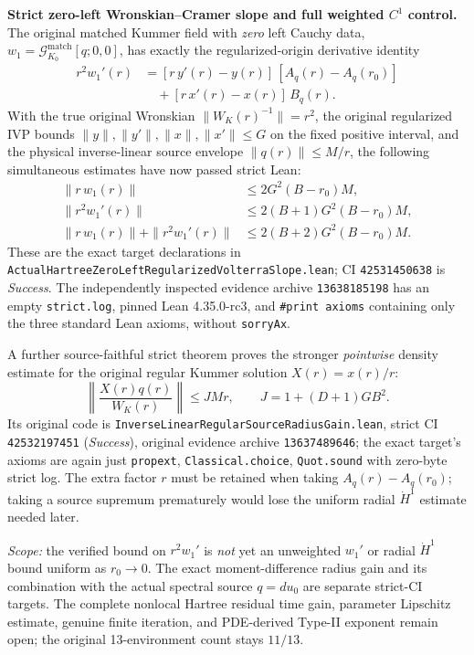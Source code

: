 \documentclass[11pt]{amsart}
\begin{document}
\medskip
\noindent\textbf{Strict zero-left Wronskian--Cramer slope and full
weighted $C^1$ control.}
The original matched Kummer field with \emph{zero} left Cauchy data,
\(w_1=\mathcal G_{K_0}^{\mathrm{match}}[q;0,0]\),
has exactly the regularized-origin derivative identity
\[
 \begin{aligned}
 r^2 w_1'(r)
  &=[r\,y'(r)-y(r)]\,[A_q(r)-A_q(r_0)]\\
  &\quad+[r\,x'(r)-x(r)]\,B_q(r).
 \end{aligned}
\]
With the true original Wronskian
\(\|W_K(r)^{-1}\|=r^2\),
the original regularized IVP bounds
\(\|y\|,\|y'\|,\|x\|,\|x'\|\le G\)
on the fixed positive interval, and the physical inverse-linear
source envelope \(\|q(r)\|\le M/r\), the following simultaneous
estimates have now passed strict Lean:
\[
 \boxed{
 \begin{aligned}
 \|r\,w_1(r)\|&\le 2G^2(B-r_0)M,\\
 \|r^2 w_1'(r)\|&\le 2(B+1)G^2(B-r_0)M,\\
 \|r\,w_1(r)\|+\|r^2w_1'(r)\|
 &\le 2(B+2)G^2(B-r_0)M .
 \end{aligned}}
\]
These are the exact target declarations in
\texttt{ActualHartreeZeroLeftRegularizedVolterraSlope.lean};
CI \texttt{42531450638} is \emph{Success}.
The independently inspected evidence archive
\texttt{13638185198} has an empty
\texttt{strict.log}, pinned Lean 4.35.0-rc3,
and \texttt{\#print axioms} containing only the
three standard Lean axioms, without \texttt{sorryAx}.

A further source-faithful strict theorem proves the stronger
\emph{pointwise} density estimate for the original regular
Kummer solution \(X(r)=x(r)/r\):
\[
 \boxed{
 \left\|\frac{X(r)q(r)}{W_K(r)}\right\|
 \le J M r,\qquad J=1+(D+1)GB^2.}
\]
Its original code is
\texttt{InverseLinearRegularSourceRadiusGain.lean},
strict CI \texttt{42532197451} (\emph{Success}),
original evidence archive \texttt{13637489646};
the exact target's axioms are again just
\texttt{propext}, \texttt{Classical.choice},
\texttt{Quot.sound} with zero-byte strict log.
The extra factor \(r\) must be retained when taking
\(A_q(r)-A_q(r_0)\); taking a source supremum prematurely
would lose the uniform radial \(\dot H^1\) estimate needed later.

\emph{Scope:} the verified bound on \(r^2 w_1'\) is
\emph{not} yet an unweighted \(w_1'\) or radial
\(\dot H^1\) bound uniform as \(r_0\to0\).
The exact moment-difference radius gain and its combination
with the actual spectral source \(q=d u_0\) are separate
strict-CI targets. The complete nonlocal Hartree residual
time gain, parameter Lipschitz estimate, genuine finite
iteration, and PDE-derived Type-II exponent remain open;
the original 13-environment count stays \(11/13\).
\end{document}
